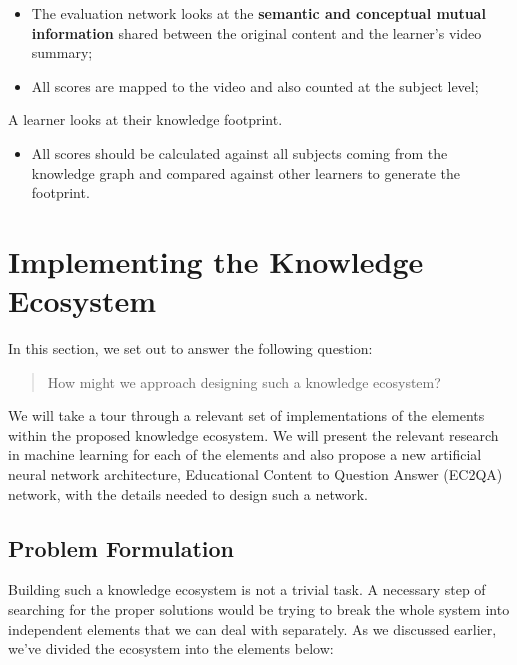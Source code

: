 \documentclass{acm_proc_article-sp}
\providecommand{\tightlist}{%
  \setlength{\itemsep}{0pt}\setlength{\parskip}{0pt}}
\begin{document}
\begin{itemize}
\item
  The evaluation network looks at the \textbf{semantic and conceptual
  mutual information} shared between the original content and the
  learner's video summary;
\item
  All scores are mapped to the video and also counted at the subject
  level;
\end{itemize}

A learner looks at their knowledge footprint.

\begin{itemize}
\tightlist
\item
  All scores should be calculated against all subjects coming from the
  knowledge graph and compared against other learners to generate the
  footprint.
\end{itemize}

\section{Implementing the Knowledge
Ecosystem}\label{implementing-the-knowledge-ecosystem}

In this section, we set out to answer the following question:

\begin{quote}
How might we approach designing such a knowledge ecosystem?
\end{quote}

We will take a tour through a relevant set of implementations of the
elements within the proposed knowledge ecosystem. We will present the
relevant research in machine learning for each of the elements and also
propose a new artificial neural network architecture, Educational
Content to Question Answer (EC2QA) network, with the details needed to
design such a network.

\subsection{Problem Formulation}\label{problem-formulation}

Building such a knowledge ecosystem is not a trivial task. A necessary
step of searching for the proper solutions would be trying to break the
whole system into independent elements that we can deal with separately.
As we discussed earlier, we've divided the ecosystem into the elements
below:
\end{document}
